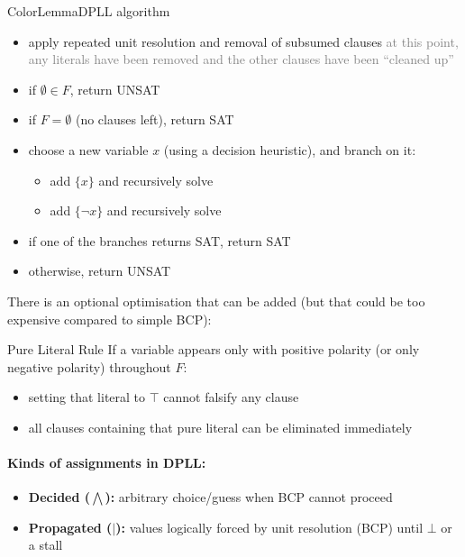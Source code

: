 \documentclass[a4paper, 11pt]{report}
\begin{document}
\begin{cframe}{ColorLemma}{DPLL algorithm}
    \begin{itemize}
        \item apply repeated unit resolution and removal of subsumed clauses
            \subitem \textcolor{gray}{at this point, any literals have been removed and the other clauses have been ``cleaned up''}
        \item if $\emptyset \in F$, return UNSAT
        \item if $F = \emptyset$ (no clauses left), return SAT
        \item choose a new variable $x$ (using a decision heuristic), and branch on it:
            \begin{itemize}
                \item add $\{x\}$ and recursively solve
                \item add $\{\neg x\}$ and recursively solve
            \end{itemize}
        \item if one of the branches returns SAT, return SAT
        \item otherwise, return UNSAT
    \end{itemize}

\end{cframe}

There is an optional optimisation that can be added (but that could be too expensive compared to simple BCP):
\begin{gframe}{Pure Literal Rule}
 If a variable appears only with positive polarity (or only negative polarity) throughout $F$:
\begin{itemize}
    \item setting that literal to $\top$ cannot falsify any clause
    \item all clauses containing that pure literal can be eliminated immediately
\end{itemize}
\end{gframe}

\paragraph{Kinds of assignments in DPLL:}
\begin{itemize}
    \item \textbf{Decided ($\bigwedge$):} arbitrary choice/guess when BCP cannot proceed
    \item \textbf{Propagated ($|$):} values logically forced by unit resolution (BCP) until $\bot$ or a stall
\end{itemize}
\end{document}
